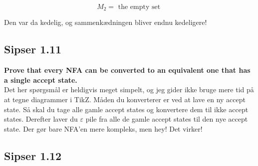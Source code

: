 \[ M_{2} = \text{ the empty set } \]
\begin{center}
\end{center}

Den var da kedelig, og sammenkædningen bliver endnu kedeligere!

\begin{center}
\end{center}

\subsection*{Sipser 1.11}%
\label{subsec:sipser1.11}

\textbf{Prove that every NFA can be converted to an equivalent one that has a single accept state.}\\

Det her spørgsmål er heldigvis meget simpelt, og jeg gider ikke bruge mere tid på at tegne diagrammer i TikZ. Måden du konverterer er ved at lave en ny accept state. Så skal du tage alle gamle accept states og konvertere dem til ikke accept states. Derefter laver du $\varepsilon$ pile fra alle de gamle accept states til den nye accept state. Der gør bare NFA'en mere kompleks, men hey! Det virker!

\subsection*{Sipser 1.12}%
\label{subsec:sipser1.12}

